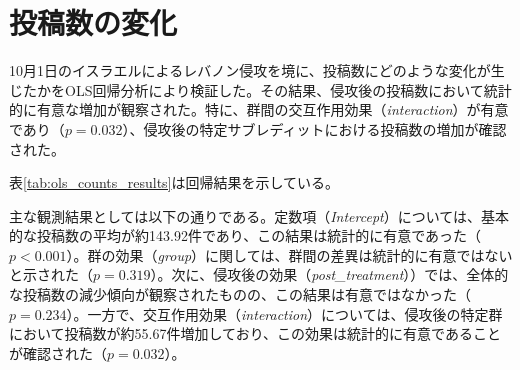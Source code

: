 \documentclass[11pt, a4j]{jreport}
\begin{document}
    \section{投稿数の変化}
    10月1日のイスラエルによるレバノン侵攻を境に、投稿数にどのような変化が生じたかをOLS回帰分析により検証した。その結果、侵攻後の投稿数において統計的に有意な増加が観察された。特に、群間の交互作用効果（\textit{interaction}）が有意であり（$p = 0.032$）、侵攻後の特定サブレディットにおける投稿数の増加が確認された。

    表\ref{tab:ols_counts_results}は回帰結果を示している。

    \begin{table}[H]
        \centering
        \caption{投稿数の変化に関するOLS回帰結果}
        \label{tab:ols_counts_results}
    \end{table}

    主な観測結果としては以下の通りである。定数項（\textit{Intercept}）については、基本的な投稿数の平均が約143.92件であり、この結果は統計的に有意であった（$p < 0.001$）。群の効果（\textit{group}）に関しては、群間の差異は統計的に有意ではないと示された（$p = 0.319$）。次に、侵攻後の効果（\textit{post\_treatment}））では、全体的な投稿数の減少傾向が観察されたものの、この結果は有意ではなかった（$p = 0.234$）。一方で、交互作用効果（\textit{interaction}）については、侵攻後の特定群において投稿数が約55.67件増加しており、この効果は統計的に有意であることが確認された（$p = 0.032$）。
\end{document}
